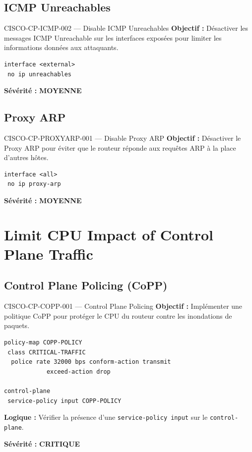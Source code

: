 \documentclass[12pt, a4paper]{report}
\begin{document}
\subsection{ICMP Unreachables}

\begin{rulebox}{CISCO-CP-ICMP-002 — Disable ICMP Unreachables}
  \textbf{Objectif :} Désactiver les messages ICMP Unreachable sur les interfaces exposées pour limiter les informations données aux attaquants.

  \begin{lstlisting}
interface <external>
 no ip unreachables
  \end{lstlisting}

  \textbf{Sévérité :} \textcolor{accentGreen}{\textbf{MOYENNE}}
\end{rulebox}

\subsection{Proxy ARP}

\begin{rulebox}{CISCO-CP-PROXYARP-001 — Disable Proxy ARP}
  \textbf{Objectif :} Désactiver le Proxy ARP pour éviter que le routeur réponde aux requêtes ARP à la place d'autres hôtes.

  \begin{lstlisting}
interface <all>
 no ip proxy-arp
  \end{lstlisting}

  \textbf{Sévérité :} \textcolor{accentGreen}{\textbf{MOYENNE}}
\end{rulebox}

\section{Limit CPU Impact of Control Plane Traffic}

\subsection{Control Plane Policing (CoPP)}

\begin{rulebox}{CISCO-CP-COPP-001 — Control Plane Policing}
  \textbf{Objectif :} Implémenter une politique CoPP pour protéger le CPU du routeur contre les inondations de paquets.

  \begin{lstlisting}
policy-map COPP-POLICY
 class CRITICAL-TRAFFIC
  police rate 32000 bps conform-action transmit
            exceed-action drop

control-plane
 service-policy input COPP-POLICY
  \end{lstlisting}

  \textbf{Logique :} Vérifier la présence d'une \texttt{service-policy input} sur le \texttt{control-plane}.

  \textbf{Sévérité :} \textcolor{accentRed}{\textbf{CRITIQUE}}
\end{rulebox}
\end{document}
